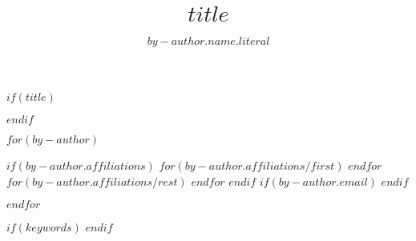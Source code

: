 $if(title)$
\title{$title$}
$endif$

$for(by-author)$
\author{$by-author.name.literal$}%
$if(by-author.affiliations)$
  $for(by-author.affiliations/first)$
%
  $endfor$
  $for(by-author.affiliations/rest)$
%
  $endfor$
$endif$
$if(by-author.email)$
$endif$

$endfor$

$if(keywords)$
$endif$